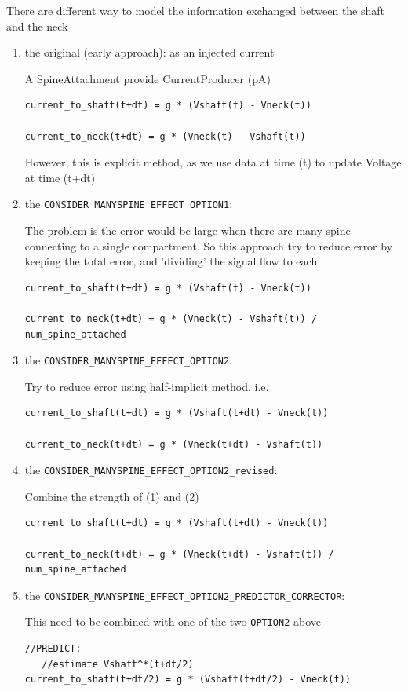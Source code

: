 There are different way to model the information exchanged between the shaft and
the neck
\begin{enumerate}
  \item the original (early approach): as an injected current
  
A SpineAttachment provide CurrentProducer (pA)
\begin{verbatim}
current_to_shaft(t+dt) = g * (Vshaft(t) - Vneck(t))

current_to_neck(t+dt) = g * (Vneck(t) - Vshaft(t))
\end{verbatim}  
However, this is explicit method, as we use data at time (t) to update Voltage
at time (t+dt)
  
  \item the \verb!CONSIDER_MANYSPINE_EFFECT_OPTION1!: 

The problem is the error would be large when there are many spine connecting to
a single compartment. So this approach try to reduce error by keeping
the total error, and 'dividing' the signal flow to each
\begin{verbatim}
current_to_shaft(t+dt) = g * (Vshaft(t) - Vneck(t))

current_to_neck(t+dt) = g * (Vneck(t) - Vshaft(t)) / num_spine_attached
\end{verbatim}  
  
  \item the \verb!CONSIDER_MANYSPINE_EFFECT_OPTION2!: 
  
Try to reduce error using half-implicit method, i.e. 
\begin{verbatim}
current_to_shaft(t+dt) = g * (Vshaft(t+dt) - Vneck(t))

current_to_neck(t+dt) = g * (Vneck(t+dt) - Vshaft(t))
\end{verbatim}  

  \item the \verb!CONSIDER_MANYSPINE_EFFECT_OPTION2_revised!: 
  
Combine the strength of (1) and (2)  
\begin{verbatim}
current_to_shaft(t+dt) = g * (Vshaft(t+dt) - Vneck(t))

current_to_neck(t+dt) = g * (Vneck(t+dt) - Vshaft(t)) / num_spine_attached
\end{verbatim}  
  
  \item the \verb!CONSIDER_MANYSPINE_EFFECT_OPTION2_PREDICTOR_CORRECTOR!:

This need to be combined with one of the two \verb!OPTION2! above
\begin{verbatim}
//PREDICT:
   //estimate Vshaft^*(t+dt/2)
current_to_shaft(t+dt/2) = g * (Vshaft(t+dt/2) - Vneck(t))


\end{verbatim}
\end{enumerate}
